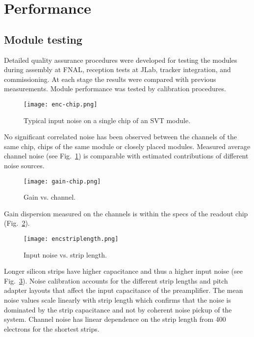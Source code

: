 \section{Performance}

\subsection{Module testing}

Detailed quality assurance procedures were developed for testing the modules during assembly at FNAL, reception tests at JLab, tracker integration, and commissioning. At each stage the results were compared with previous measurements. Module performance was tested by calibration procedures. 

\begin{figure}[hbt] 
\centering 
\texttt{[image: enc-chip.png]}
\caption{Typical input noise on a single chip of an SVT module.}
\label{fig:enc-chip}
\end{figure}

No significant correlated noise has been observed between the channels of the same chip, chips of the same module or closely placed modules. Measured average channel noise (see Fig.~\ref{fig:enc-chip}) is comparable with estimated contributions of different noise sources. 

\begin{figure}[hbt] 
\centering 
\texttt{[image: gain-chip.png]}
\caption{Gain vs. channel.}
\label{fig:gain-chip}
\end{figure}

Gain dispersion measured on the channels is within the specs of the readout chip (Fig.~\ref{fig:gain-chip}).

\begin{figure}[hbt] 
	\centering 
	\texttt{[image: encstriplength.png]}
	\caption{Input noise vs. strip length.}
	\label{fig:encstriplength}
\end{figure}

Longer silicon strips have higher capacitance and thus a higher input noise (see Fig.~\ref{fig:encstriplength}). Noise calibration accounts for the different strip lengths and pitch adapter layouts that affect the input capacitance of the preamplifier. The mean noise values scale linearly with strip length which confirms that the noise is dominated by the strip capacitance and not by coherent noise pickup of the system. Channel noise has linear dependence on the strip length from 400 electrons for the shortest strips.  

